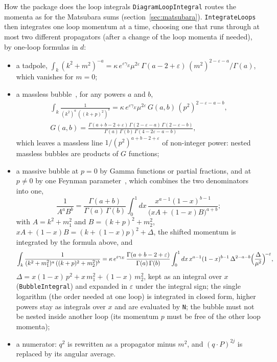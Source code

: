 \documentclass[11pt,a4paper]{article}
\newcommand{\pkg}[1]{\texttt{#1}}
\begin{document}
\begin{methodbox}{How the package does the loop integrals}
\pkg{DiagramLoopIntegral} routes the momenta as for the Matsubara sums (section~\ref{sec:matsubara}).
\pkg{IntegrateLoops} then integrates one loop momentum at a time, choosing one that runs through at most two different
propagators (after a change of the loop momenta if needed), by one-loop formulas in $d$:
\begin{itemize}[leftmargin=1.2em, itemsep=1pt, topsep=2pt]
\item a tadpole, $\int_k(k^2+m^2)^{-a}=\kappa\,e^{\varepsilon\gamma_E}\mu^{2\varepsilon}\,\Gamma(a-2+\varepsilon)\,
  (m^2)^{2-\varepsilon-a}/\Gamma(a)$, which vanishes for $m=0$;
\item a massless bubble~\cite{Grozin2004}, for any powers $a$ and $b$,
\begin{gather*}
\int_k\frac1{(k^2)^a\,((k+p)^2)^b}=\kappa\,e^{\varepsilon\gamma_E}\mu^{2\varepsilon}\,G(a,b)\,(p^2)^{2-\varepsilon-a-b},\\
G(a,b)=\frac{\Gamma(a+b-2+\varepsilon)\,\Gamma(2-\varepsilon-a)\,\Gamma(2-\varepsilon-b)}{\Gamma(a)\,\Gamma(b)\,\Gamma(4-2\varepsilon-a-b)},
\end{gather*}
  which leaves a massless line $1/(p^2)^{a+b-2+\varepsilon}$ of non-integer power: nested massless bubbles are products of
  $G$ functions;
\item a massive bubble at $p=0$ by Gamma functions or partial fractions, and at $p\neq0$ by one Feynman
  parameter~\cite{Feynman1949}, which combines the two denominators into one,
\[
\frac1{A^aB^b}=\frac{\Gamma(a+b)}{\Gamma(a)\,\Gamma(b)}\int_0^1dx\,\frac{x^{a-1}(1-x)^{b-1}}{\bigl(xA+(1-x)B\bigr)^{a+b}} ;
\]
  with $A=k^2+m_1^2$ and $B=(k+p)^2+m_2^2$, $xA+(1-x)B=(k+(1-x)p)^2+\Delta$, the shifted momentum is integrated by the
  formula above, and
\[
\int_k\frac1{(k^2+m_1^2)^a\,((k+p)^2+m_2^2)^b}=\kappa\,e^{\varepsilon\gamma_E}\,\frac{\Gamma(a+b-2+\varepsilon)}{\Gamma(a)\,\Gamma(b)}
\int_0^1dx\,x^{a-1}(1-x)^{b-1}\,\Delta^{2-a-b}\Bigl(\frac{\Delta}{\mu^2}\Bigr)^{\!-\varepsilon},
\]
  $\Delta=x(1-x)\,p^2+x\,m_1^2+(1-x)\,m_2^2$, kept as an integral over $x$ (\pkg{BubbleIntegral}) and expanded in
  $\varepsilon$ under the integral sign; the single logarithm (the order needed at one loop) is integrated in closed form,
  higher powers stay as integrals over $x$ and are evaluated by \pkg{N}; the bubble must not be nested inside another loop
  (its momentum $p$ must be free of the other loop momenta);
\item a numerator: $q^2$ is rewritten as a propagator minus $m^2$, and $(q\cdot P)^{2j}$ is replaced by its angular average.

\end{itemize}
\end{methodbox}
\end{document}
